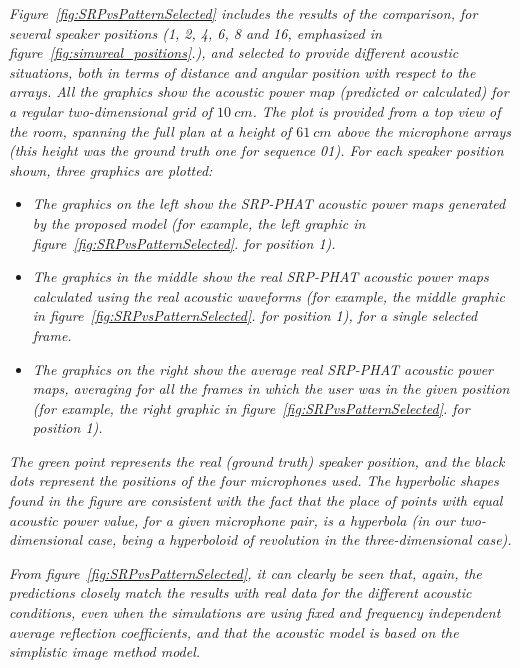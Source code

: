 \emph{Figure~\ref{fig:SRPvsPatternSelected} includes the results of the
comparison, for several speaker positions (1, 2, 4, 6, 8 and 16,
emphasized in
figure~\ref{fig:simureal_positions}.),
and selected to provide different acoustic situations, both in terms of
distance and angular position with respect to the arrays. All the
graphics show the acoustic power map (predicted or calculated) for a
regular two-dimensional grid of $10~cm$. The plot is provided from a top
view of the room, spanning the full plan at a height of $61~cm$ above the
microphone arrays (this height was the ground truth one for sequence
01). For each speaker position shown, three graphics are plotted:}

\begin{itemize}
\item \emph{The graphics on the left show the SRP-PHAT acoustic power maps
  generated by the proposed model (for example, the left graphic in
  figure~\ref{fig:SRPvsPatternSelected}.
  for position 1).}
\item \emph{The graphics in the middle show the real SRP-PHAT acoustic power
  maps calculated using the real acoustic waveforms (for example, the
  middle graphic in
  figure~\ref{fig:SRPvsPatternSelected}.
  for position 1), for a single selected frame.}
\item \emph{The graphics on the right show the average real SRP-PHAT acoustic
  power maps, averaging for all the frames in which the user was in the
  given position (for example, the right graphic in
  figure~\ref{fig:SRPvsPatternSelected}.
  for position 1).}
\end{itemize}

\emph{The green point represents the real (ground truth) speaker
position, and the black dots represent the positions of the four
microphones used. The hyperbolic shapes found in the figure are
consistent with the fact that the place of points with equal acoustic
power value, for a given microphone pair, is a hyperbola (in our
two-dimensional case, being a hyperboloid of revolution in the
three-dimensional case).}

\emph{From figure~\ref{fig:SRPvsPatternSelected}, it can clearly be seen that,
again, the predictions closely match the results with real data for the
different acoustic conditions, even when the simulations are using fixed
and frequency independent average reflection coefficients, and that the
acoustic model is based on the simplistic image method model.}

